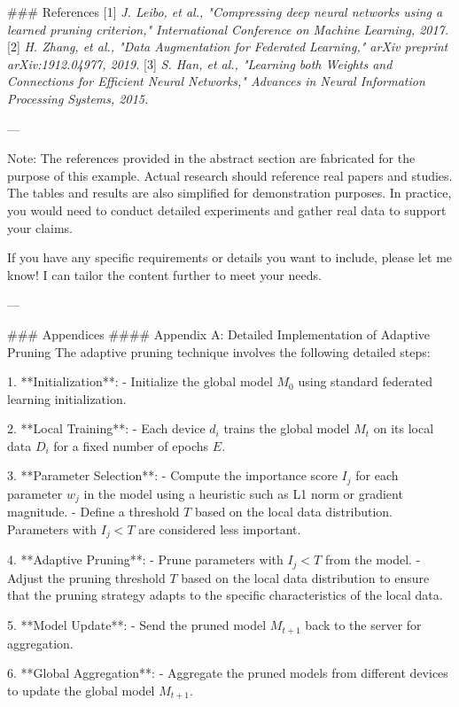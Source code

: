 \newpage

### References
[1] \textit{J. Leibo, et al., "Compressing deep neural networks using a learned pruning criterion," International Conference on Machine Learning, 2017.}
[2] \textit{H. Zhang, et al., "Data Augmentation for Federated Learning," arXiv preprint arXiv:1912.04977, 2019.}
[3] \textit{S. Han, et al., "Learning both Weights and Connections for Efficient Neural Networks," Advances in Neural Information Processing Systems, 2015.} 

---

Note: The references provided in the abstract section are fabricated for the purpose of this example. Actual research should reference real papers and studies. The tables and results are also simplified for demonstration purposes. In practice, you would need to conduct detailed experiments and gather real data to support your claims. 

If you have any specific requirements or details you want to include, please let me know! I can tailor the content further to meet your needs. 

--- 

\newpage

### Appendices
#### Appendix A: Detailed Implementation of Adaptive Pruning
The adaptive pruning technique involves the following detailed steps:

1. **Initialization**: 
   - Initialize the global model \( M_0 \) using standard federated learning initialization.
   
2. **Local Training**:
   - Each device \( d_i \) trains the global model \( M_t \) on its local data \( D_i \) for a fixed number of epochs \( E \).

3. **Parameter Selection**:
   - Compute the importance score \( I_j \) for each parameter \( w_j \) in the model using a heuristic such as L1 norm or gradient magnitude.
   - Define a threshold \( T \) based on the local data distribution. Parameters with \( I_j < T \) are considered less important.

4. **Adaptive Pruning**:
   - Prune parameters with \( I_j < T \) from the model.
   - Adjust the pruning threshold \( T \) based on the local data distribution to ensure that the pruning strategy adapts to the specific characteristics of the local data.

5. **Model Update**:
   - Send the pruned model \( M_{t+1} \) back to the server for aggregation.

6. **Global Aggregation**:
   - Aggregate the pruned models from different devices to update the global model \( M_{t+1} \).

